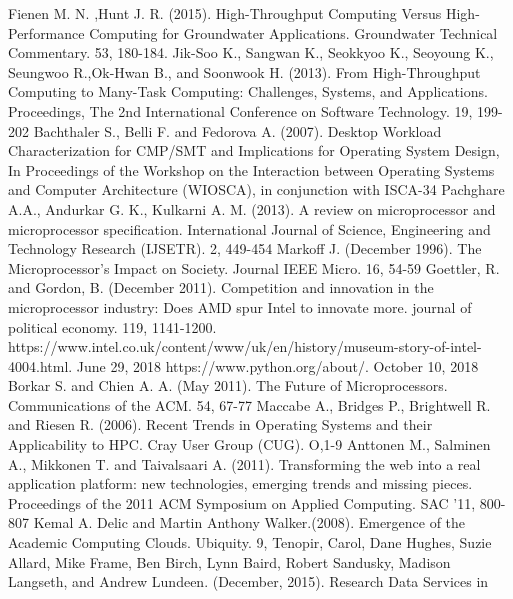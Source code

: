 \begin{thebibliography}{00}


Fienen M. N. ,Hunt J. R. (2015). High-Throughput Computing Versus 
High-Performance Computing for Groundwater Applications. Groundwater Technical Commentary. 53, 180-184.
Jik-Soo K., Sangwan K., Seokkyoo K., Seoyoung K., Seungwoo R.,Ok-Hwan B., and Soonwook H.
(2013). From High-Throughput Computing to Many-Task Computing: Challenges, Systems, and Applications. Proceedings,
 The 2nd International Conference on Software Technology. 19, 199-202
Bachthaler S., Belli F. and Fedorova A. (2007). Desktop Workload Characterization for CMP/SMT and 
Implications for Operating System Design, In Proceedings of the Workshop on the Interaction between Operating 
Systems and Computer Architecture (WIOSCA), in conjunction with ISCA-34 
 Pachghare A.A., Andurkar G. K., Kulkarni A. M. (2013). A review on microprocessor and microprocessor specification.
International Journal of Science, Engineering and Technology Research (IJSETR). 2, 449-454
 Markoff J. (December 1996). The Microprocessor's Impact on Society. Journal IEEE Micro. 16, 54-59
 Goettler, R. and Gordon, B. (December 2011). Competition and innovation in the microprocessor industry: Does AMD spur Intel to innovate more. journal of political economy. 119, 1141-1200.
 https://www.intel.co.uk/content/www/uk/en/history/museum-story-of-intel-4004.html. June 29, 2018
 https://www.python.org/about/. October 10, 2018
 Borkar S. and Chien A. A. (May 2011). The Future of Microprocessors. Communications of the ACM. 54, 67-77
 Maccabe A., Bridges P., Brightwell R. and Riesen R. (2006). Recent Trends in Operating Systems and their Applicability to HPC. Cray User Group (CUG). O,1-9
 Anttonen M., Salminen A., Mikkonen T. and Taivalsaari A. (2011). Transforming the
 web into a real application platform: new technologies, emerging trends and missing pieces. Proceedings 
of the 2011 ACM Symposium on Applied Computing. SAC '11, 800-807
 Kemal A. Delic and Martin Anthony Walker.(2008). Emergence of the Academic Computing Clouds. 
Ubiquity. 9,
 Tenopir, Carol, Dane Hughes, Suzie Allard, Mike Frame, Ben Birch, Lynn Baird, 
Robert Sandusky, Madison Langseth, and Andrew Lundeen. (December, 2015). Research Data Services in 

\end{thebibliography}
